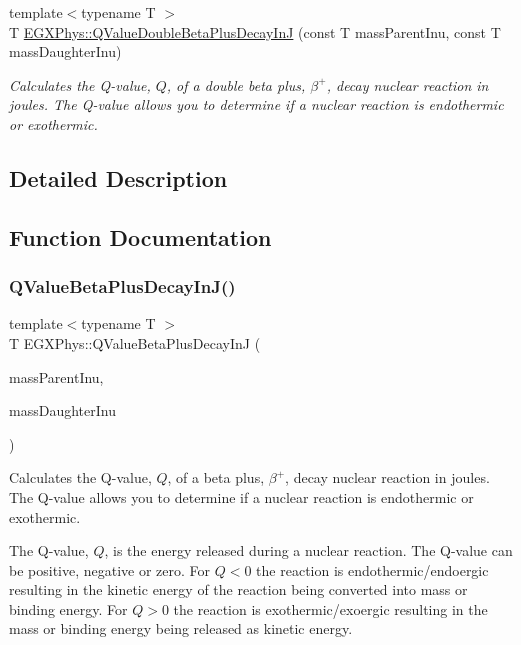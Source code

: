 \begin{DoxyCompactItemize}
{\footnotesize template$<$typename T $>$ }\\T \mbox{\hyperlink{group___e_g_x_phys-_q_value-_beta_plus_ga3531ffda0c561a601a61f54f5c7780df}{E\+G\+X\+Phys\+::\+Q\+Value\+Double\+Beta\+Plus\+Decay\+InJ}} (const T mass\+Parent\+Inu, const T mass\+Daughter\+Inu)
\begin{DoxyCompactList}\small\item\em Calculates the Q-\/value, $Q$, of a double beta plus, $\beta^+$, decay nuclear reaction in joules. The Q-\/value allows you to determine if a nuclear reaction is endothermic or exothermic. \end{DoxyCompactList}\end{DoxyCompactItemize}


\subsection{Detailed Description}


\subsection{Function Documentation}
\mbox{\label{group___e_g_x_phys-_q_value-_beta_plus_gaaee51753f077c9fe05188aa5b24f642e}} 
\subsubsection{\texorpdfstring{Q\+Value\+Beta\+Plus\+Decay\+In\+J()}{QValueBetaPlusDecayInJ()}}
{\footnotesize\ttfamily template$<$typename T $>$ \\
T E\+G\+X\+Phys\+::\+Q\+Value\+Beta\+Plus\+Decay\+InJ (\begin{DoxyParamCaption}\item[{const T}]{mass\+Parent\+Inu,  }\item[{const T}]{mass\+Daughter\+Inu }\end{DoxyParamCaption})}



Calculates the Q-\/value, $Q$, of a beta plus, $\beta^+$, decay nuclear reaction in joules. The Q-\/value allows you to determine if a nuclear reaction is endothermic or exothermic. 

The Q-\/value, $Q$, is the energy released during a nuclear reaction. The Q-\/value can be positive, negative or zero. For $Q < 0$ the reaction is endothermic/endoergic resulting in the kinetic energy of the reaction being converted into mass or binding energy. For $Q > 0$ the reaction is exothermic/exoergic resulting in the mass or binding energy being released as kinetic energy.

